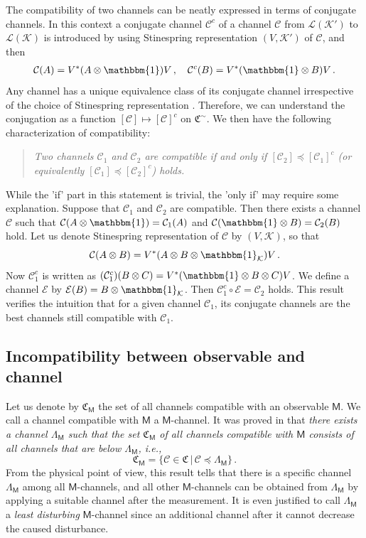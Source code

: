 \documentclass[12pt]{article}
\theoremstyle{definition}
\newcommand{\hik}{\mathcal{K}} %
\newcommand{\id}{\mathbbm{1}} %
\newcommand{\Mo}{\mathsf{M}}%
\newcommand{\chan}{\mathfrak{C}}
\newcommand{\ch}[1]{\mathfrak{C}_{#1}}
\newcommand{\Cc}{\mathcal{C}} %
\newcommand{\Ec}{\mathcal{E}} %
\newcommand{\pleq}{\preceq}
\begin{document}
{The compatibility of two channels can be neatly expressed in terms of conjugate channels.
In this context a conjugate channel $\Cc^c$ of a channel $\Cc$ from $\mathcal{L}(\hik')$ to $\mathcal{L}(\hik)$ is 
introduced by using Stinespring representation $(V, \hik')$ of $\Cc$, and then 
\begin{eqnarray*}
\Cc(A) = V^*(A \otimes \id)V \, , \quad \Cc^c(B) = V^*(\id \otimes B)V \, . 
\end{eqnarray*} 
Any channel has a unique equivalence class of its conjugate channel irrespective of the choice of Stinespring representation \cite{HeMi15}. 
Therefore, we can understand the conjugation as a function $[\Cc] \mapsto [\Cc]^c$ on $\chan^\sim$.
We then have the following characterization of compatibility:
\begin{quote}
\emph{Two channels $\Cc_1$ and $\Cc_2$ are compatible if and only if 
$[\Cc_2] \pleq [\Cc_1]^c$ (or equivalently $[\Cc_1]
\pleq [\Cc_2]^c$) holds.} 
\end{quote}

While the 'if' part in this statement is trivial, the 'only if' may require some explanation. 
Suppose that $\Cc_1$ and $\Cc_2$ are compatible. 
Then there exists a channel $\Cc$ such that 
$\Cc(A\otimes \id) = \Cc_1(A)$ and 
$\Cc(\id \otimes B) = \Cc_2(B)$ hold. 
Let us denote Stinespring representation of $\Cc$ by 
$(V, \hik)$, so that
\begin{equation}
\Cc(A\otimes B) = V^*(A\otimes B\otimes \id_{\hik})V \, .
\end{equation}
Now $\Cc_1^c$ is written as 
$(\Cc_1^c)(B \otimes C) = V^*(\id \otimes B\otimes C)V$. 
We define a channel $\Ec$ by 
$\Ec(B ) = B\otimes \id_{\hik}$. Then 
$\Cc_1^c \circ \Ec = \Cc_2$ holds.   
This result verifies the intuition that for a given channel $\Cc_1$, its conjugate channels are the best channels still compatible with $\Cc_1$.
 
\subsection{Incompatibility between observable and channel}

Let us denote by $\ch{\Mo}$ the set of all channels compatible with an observable $\Mo$. 
We call a channel compatible with $\Mo$ a $\Mo$-channel. 
It was proved in \cite{HeMi13} that
\emph{there exists a channel $\Lambda_\Mo$ such that  
the set $\chan_{\Mo}$ of all channels compatible with $\Mo$ consists of all channels that are below $\Lambda_\Mo$, i.e.,
\begin{equation}
\chan_{\Mo}=\{ \Cc \in \chan \, |\,  \Cc \pleq \Lambda_\Mo \} \, .
\end{equation}}
From the physical point of view, this result tells that there is a specific channel $\Lambda_\Mo$ among all $\Mo$-channels, and all other $\Mo$-channels can be obtained from $\Lambda_\Mo$ by applying a suitable channel after the measurement. 
It is even justified to call $\Lambda_\Mo$ a \emph{least disturbing} $\Mo$-channel since an additional channel after it cannot decrease the caused disturbance.

}
\end{document}
